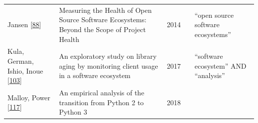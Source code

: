 \documentclass[]{book}
\begin{document}
\begin{longtable}[]{@{}lllll@{}}
\begin{minipage}[t]{0.05\columnwidth}
Jansen {[}\protect\hyperlink{ref-Jansen2014}{88}{]}\strut
\end{minipage} & \begin{minipage}[t]{0.31\columnwidth}\raggedright\strut
Measuring the Health of Open Source Software Ecosystems: Beyond the
Scope of Project Health\strut
\end{minipage} & \begin{minipage}[t]{0.02\columnwidth}\raggedright\strut
2014\strut
\end{minipage} & \begin{minipage}[t]{0.34\columnwidth}\raggedright\strut
\strut
\end{minipage} & \begin{minipage}[t]{0.13\columnwidth}\raggedright\strut
``open source software ecosystems''\strut
\end{minipage}\tabularnewline
\begin{minipage}[t]{0.05\columnwidth}\raggedright\strut
Kula, German, Ishio, Inoue
{[}\protect\hyperlink{ref-Kula2017-2}{103}{]}\strut
\end{minipage} & \begin{minipage}[t]{0.31\columnwidth}\raggedright\strut
An exploratory study on library aging by monitoring client usage in a
software ecosystem\strut
\end{minipage} & \begin{minipage}[t]{0.02\columnwidth}\raggedright\strut
2017\strut
\end{minipage} & \begin{minipage}[t]{0.34\columnwidth}\raggedright\strut
\strut
\end{minipage} & \begin{minipage}[t]{0.13\columnwidth}\raggedright\strut
``software ecosystem'' AND ``analysis''\strut
\end{minipage}\tabularnewline
\begin{minipage}[t]{0.05\columnwidth}\raggedright\strut
Malloy, Power {[}\protect\hyperlink{ref-Malloy2018}{117}{]}\strut
\end{minipage} & \begin{minipage}[t]{0.31\columnwidth}\raggedright\strut
An empirical analysis of the transition from Python 2 to Python 3\strut
\end{minipage} & \begin{minipage}[t]{0.02\columnwidth}\raggedright\strut
2018\strut
\end{minipage} & \begin{minipage}[t]{0.34\columnwidth}\raggedright\strut

\end{minipage}
\end{longtable}
\end{document}

